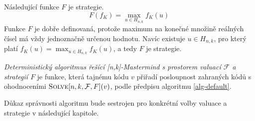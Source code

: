 
\begin{prikl}\label{prstrategie}
    Následující funkce $F$ je strategie.
    \[F(f_K) =  \max_{u\in H_{n,k}} f_K(u)\]
    Funkce $F$ je dobře definovaná, protože maximum na konečné množině reálných čísel má vždy jednoznačně určenou hodnotu. Navíc existuje $u\in H_{n,k}$, pro který platí $f_K(u) = \max_{u\in H_{n,k}} f_K(u)$, a tedy $F$ je strategie.
\end{prikl}

\begin{definice}\label{defobecnyalg}
    \emph{Deterministický algoritmus řešící [n,k]-Mastermind s prostorem valuací $\mathcal{F}$ a strategií $F$} je funkce, která tajnému kódu $v$ přiřadí posloupnost zahraných kódů s ohodnoceními $\textsc{Solve}[n, k, \mathcal{F}, F](v)$, podle předpisu algoritmu \ref{alg-default}.
    
    
    
\end{definice}
\begin{pozn}
    Důkaz správnosti algoritmu bude sestrojen pro konkrétní volby valuace a strategie v následující kapitole. 
\end{pozn}








